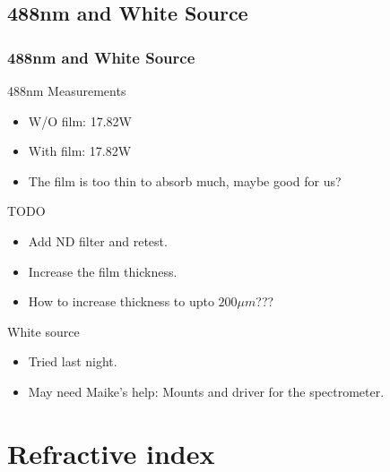 \documentclass[bigger, english, 10pt, presentation]{beamer}
\begin{document}
\subsection{488nm and White Source}
\label{sec-2-1}
\begin{frame}
\frametitle{488nm and White Source}
\label{sec-2-1-1}
\begin{block}{488nm Measurements}
\label{sec-2-1-1-1}

\begin{itemize}
\item W/O film: 17.82W
\item With film: 17.82W
\item The film is too thin to absorb much, maybe good for us?
\end{itemize}
\end{block}
\begin{block}{TODO}
\label{sec-2-1-1-2}

\begin{itemize}
\item Add ND filter and retest.
\item Increase the film thickness.
\item How to increase thickness to upto $200 \mu m$???
\end{itemize}
\end{block}
\begin{block}{White source}
\label{sec-2-1-1-3}

\begin{itemize}
\item Tried last night.
\item May need Maike's help: Mounts and driver for the spectrometer.
\end{itemize}
\end{block}
\end{frame}
\section{Refractive index}
\label{sec-3}
\end{document}
